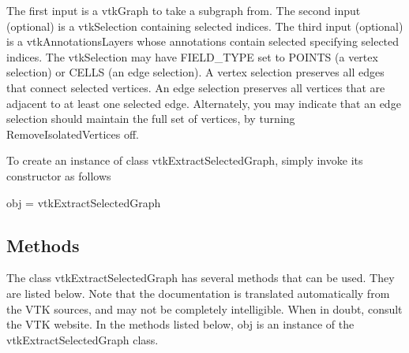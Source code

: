 The first input is a vtk\-Graph to take a subgraph from. The second input (optional) is a vtk\-Selection containing selected indices. The third input (optional) is a vtk\-Annotations\-Layers whose annotations contain selected specifying selected indices. The vtk\-Selection may have F\-I\-E\-L\-D\-\_\-\-T\-Y\-P\-E set to P\-O\-I\-N\-T\-S (a vertex selection) or C\-E\-L\-L\-S (an edge selection). A vertex selection preserves all edges that connect selected vertices. An edge selection preserves all vertices that are adjacent to at least one selected edge. Alternately, you may indicate that an edge selection should maintain the full set of vertices, by turning Remove\-Isolated\-Vertices off.

To create an instance of class vtk\-Extract\-Selected\-Graph, simply invoke its constructor as follows \begin{DoxyVerb}  obj = vtkExtractSelectedGraph
\end{DoxyVerb}
 \hypertarget{vtkwidgets_vtkxyplotwidget_Methods}{}\subsection{Methods}\label{vtkwidgets_vtkxyplotwidget_Methods}
The class vtk\-Extract\-Selected\-Graph has several methods that can be used. They are listed below. Note that the documentation is translated automatically from the V\-T\-K sources, and may not be completely intelligible. When in doubt, consult the V\-T\-K website. In the methods listed below, {\ttfamily obj} is an instance of the vtk\-Extract\-Selected\-Graph class. 
